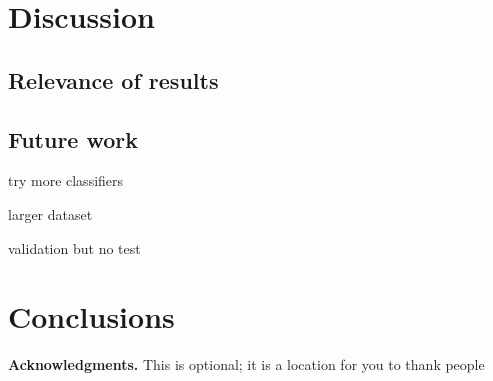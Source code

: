 \documentclass{mpaper}
\begin{document}
\section{Discussion}

\subsection{Relevance of results}

\subsection{Future work}

try more classifiers

larger dataset

validation but no test

\section{Conclusions}


{\bf Acknowledgments.}
This is optional; it is a location for you to thank people



\end{document}
